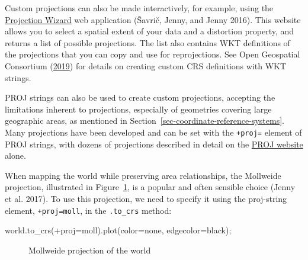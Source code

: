 \documentclass[
  letterpaper,
]{krantz}
\newenvironment{Shaded}{\begin{snugshade}}{\end{snugshade}}
\newcommand{\NormalTok}[1]{\textcolor[rgb]{0.00,0.23,0.31}{#1}}
\newcommand{\OperatorTok}[1]{\textcolor[rgb]{0.37,0.37,0.37}{#1}}
\newcommand{\StringTok}[1]{\textcolor[rgb]{0.13,0.47,0.30}{#1}}
\begin{document}
Custom projections can also be made interactively, for example, using
the \href{https://projectionwizard.org/\#}{Projection Wizard} web
application (Šavrič, Jenny, and Jenny 2016). This website allows you to
select a spatial extent of your data and a distortion property, and
returns a list of possible projections. The list also contains WKT
definitions of the projections that you can copy and use for
reprojections. See Open Geospatial Consortium
(\href{https://r.geocompx.org/references.html\#ref-opengeospatialconsortium_wellknown_2019}{2019})
for details on creating custom CRS definitions with WKT strings.

PROJ strings can also be used to create custom projections, accepting
the limitations inherent to projections, especially of geometries
covering large geographic areas, as mentioned in
Section~\ref{sec-coordinate-reference-systems}. Many projections have
been developed and can be set with the \texttt{+proj=} element of PROJ
strings, with dozens of projections described in detail on the
\href{https://proj.org/operations/projections/index.html}{PROJ website}
alone.

When mapping the world while preserving area relationships, the
Mollweide projection, illustrated in Figure~\ref{fig-mollweide}, is a
popular and often sensible choice (Jenny et al. 2017). To use this
projection, we need to specify it using the proj-string element,
\texttt{\textquotesingle{}+proj=moll\textquotesingle{}}, in the
\texttt{.to\_crs} method:

\begin{Shaded}
\begin{Highlighting}[]
\NormalTok{world.to\_crs(}\StringTok{\textquotesingle{}+proj=moll\textquotesingle{}}\NormalTok{).plot(color}\OperatorTok{=}\StringTok{\textquotesingle{}none\textquotesingle{}}\NormalTok{, edgecolor}\OperatorTok{=}\StringTok{\textquotesingle{}black\textquotesingle{}}\NormalTok{)}\OperatorTok{;}
\end{Highlighting}
\end{Shaded}

\begin{figure}[H]


\caption{\label{fig-mollweide}Mollweide projection of the world}

\end{figure}%
\end{document}
